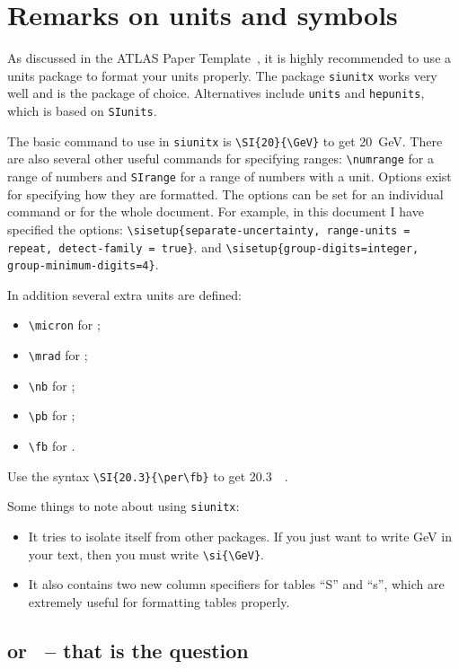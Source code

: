 \documentclass[koma,UKenglish]{style/atlasdoc}
\newcommand{\Package}[1]{\texttt{#1}\xspace}
\begin{document}
\section{Remarks on units and symbols}

As discussed in the ATLAS Paper Template~\cite{atlas-paper},
it is highly recommended to use a units package to format your units properly.
The package \Package{siunitx} works very well and is the package of choice.
Alternatives include \Package{units} and \Package{hepunits},
which is based on \Package{SIunits}.

The basic command to use in \Package{siunitx} is \verb|\SI{20}{\GeV}| to get
\SI{20}{\GeV}. 
There are also several other useful commands for specifying ranges:
\verb|\numrange| for a range of numbers and \verb|SIrange| for a range of numbers with a unit. 
Options exist for specifying how they are formatted.
The options can be set for an individual command or for the whole document.
For example, in this document I have specified the options:
\verb|\sisetup{separate-uncertainty, range-units = repeat, detect-family = true}|.
and
\verb|\sisetup{group-digits=integer, group-minimum-digits=4}|.

In addition several extra units are defined:
\begin{itemize}
\item \verb|\micron| for \si{\micron};
\item \verb|\mrad| for \si{\mrad};
\item \verb|\nb| for \si{\nb};
\item \verb|\pb| for \si{\pb};
\item \verb|\fb| for \si{\fb}.
\end{itemize}
Use the syntax \verb|\SI{20.3}{\per\fb}| to get \SI{20.3}{\per\fb}.

Some things to note about using \Package{siunitx}:
\begin{itemize}
\item It tries to isolate itself from other packages.
	If you just want to write \si{\GeV} in your text,
	then you must write \verb|\si{\GeV}|.
\item It also contains two new column specifiers for tables ``S'' and ``s'',
	which are extremely useful for formatting tables properly.
\end{itemize}

\subsection{\pT or \ET\ -- that is the question}
\end{document}
